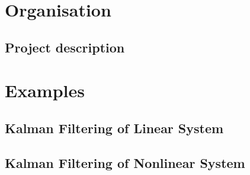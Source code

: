 
\appendix               	%
\chapter{Organisation} 
\section{Project description} \label{PrjDescription} 



\chapter{Examples} 
\section{Kalman Filtering of Linear System} \label{ExampleKF} 


\section{Kalman Filtering of Nonlinear System} \label{ExampleEKF}
